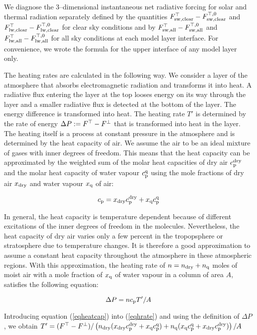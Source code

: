 \begin{appendix}
We diagnose the 3--dimensional instantaneous net radiative forcing for
solar and thermal radiation separately defined by the quantities
$F^{\top}_{\rm sw, clear}-F^{\top,0}_{\rm sw, clear}$ and $F^{\top}_{\rm lw, clear}-F^{\top,0}_{\rm lw, clear}$ for clear sky conditions and
by $F^{\top}_{\rm sw, all}-F^{\top,0}_{\rm sw, all}$ and $F^{\top}_{\rm lw, all}-F^{\top,0}_{\rm lw, all}$ for all sky conditions at each
model layer interface. For convenience, we wrote the formula for the
upper interface of any model layer only.

The heating rates are calculated in the following way. We consider a
layer of the atmosphere that absorbs electromagnetic radiation and
transforms it into heat. A radiative flux entering the layer at the
top looses energy on its way through the layer and a smaller radiative
flux is detected at the bottom of the layer. The energy difference is
transformed into heat. The heating rate $T'$ is determined
by the rate of energy $\Delta P:= F^{\top}-F^{\bot}$ that is transformed into
heat in the layer. The heating itself is a process at 
constant pressure in the atmosphere and is determined by the heat
capacity of air. We assume the air to be an ideal mixture of gases with inner
degrees of freedom. This means that the heat capacity can be
approximated by the weighted sum of the molar heat capacities of dry air
$c_{\rm p}^{\rm dry}$ and the molar heat capacity of water vapour
$c_{\rm p}^{\rm q}$ using the mole fractions of dry air $x_{\rm dry}$
and water vapour $x_{\rm q}$ of air:

\begin{equation}\label{eqheatcap}
c_{\rm p}=x_{\rm dry}c_{\rm p}^{\rm dry}+x_{\rm q}c_{\rm p}^{\rm q}
\end{equation}

In general, the heat capacity is temperature dependent because of
different excitations of the inner degrees of freedom in the
molecules. Nevertheless, the heat capacity of dry air varies only a
few percent in the tropopsphere or stratosphere due to temperature
changes. It is therefore a good approximation to assume a constant
heat capacity throughout the atmosphere in these atmospheric regions.
With this approximation, the heating rate of $n=n_{\rm dry}+n_{\rm q}$
moles of moist air 
with a mole fraction of $x_{\rm q}$ of water vapour in a column of
area $A$, satisfies the
following equation: 

\begin{equation}\label{eqhrate}
\Delta P = n c_{\rm p} T'/A 
\end{equation}

Introducing equation (\ref{eqheatcap}) into (\ref{eqhrate}) and using
the definition of $\Delta P$, we obtain
$T'=(F^{\top}-F^{\bot})/\left(n_{\rm dry}(x_{\rm dry}c_{\rm p}^{\rm dry}+
                          x_{\rm q}c_{\rm p}^{\rm q})+
               n_{\rm q}  (x_{\rm q}c_{\rm p}^{\rm q}+
                          x_{\rm dry}c_{\rm p}^{\rm dry})\right)/A$


\end{appendix}
